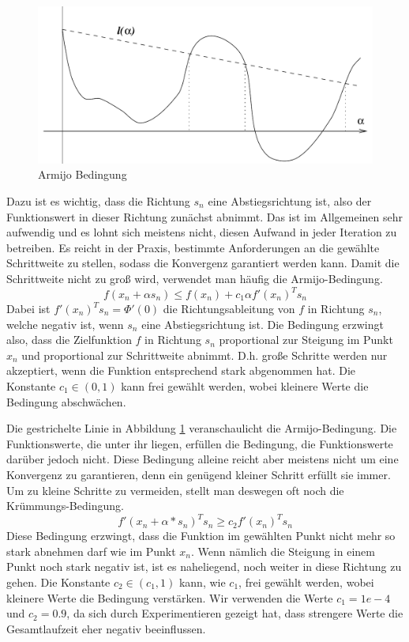 \documentclass[runningheads,a4paper]{llncs}
\begin{document}
\begin{figure}[ht]
 \centering
 \includegraphics[width=\textwidth]{armijo}
 \caption{Armijo Bedingung \cite{nocedal1999numerical}}
 \label{img:armijo}
\end{figure}

Dazu ist es wichtig, dass die Richtung $s_n$ eine Abstiegsrichtung ist, also der Funktionswert in dieser Richtung zunächst abnimmt. Das ist im Allgemeinen sehr aufwendig und es lohnt sich meistens nicht, diesen Aufwand in jeder Iteration zu betreiben. Es reicht in der Praxis, bestimmte Anforderungen an die gewählte Schrittweite zu stellen, sodass die Konvergenz garantiert werden kann. Damit die Schrittweite nicht zu groß wird, verwendet man häufig die Armijo-Bedingung.
\begin{equation}
\label{eq:armijo}
f(x_n+\alpha s_n) \le f(x_n)+c_1\alpha f'(x_n)^T s_n
\end{equation}
Dabei ist $f'(x_n)^T s_n = \Phi'(0)$ die Richtungsableitung von $f$ in Richtung $s_n$, welche negativ ist, wenn $s_n$ eine Abstiegsrichtung ist. Die Bedingung erzwingt also, dass die Zielfunktion $f$ in Richtung $s_n$ proportional zur Steigung im Punkt $x_n$ und proportional zur Schrittweite abnimmt. D.h. große Schritte werden nur akzeptiert, wenn die Funktion entsprechend stark abgenommen hat. Die Konstante $c_1 \in (0,1)$ kann frei gewählt werden, wobei kleinere Werte die Bedingung abschwächen.

Die gestrichelte Linie in Abbildung \ref{img:armijo} veranschaulicht die Armijo-Bedingung. Die Funktionswerte, die unter ihr liegen, erfüllen die Bedingung, die Funktionswerte darüber jedoch nicht. Diese Bedingung alleine reicht aber meistens nicht um eine Konvergenz zu garantieren, denn ein genügend kleiner Schritt erfüllt sie immer. Um zu kleine Schritte zu vermeiden, stellt man deswegen oft noch die Krümmungs-Bedingung.
\begin{equation}
\label{eq:curvature}
f'(x_n+\alpha*s_n)^T s_n \ge c_2 f'(x_n)^T s_n
\end{equation}
Diese Bedingung erzwingt, dass die Funktion im gewählten Punkt nicht mehr so stark abnehmen darf wie im Punkt $x_n$. Wenn nämlich die Steigung in einem Punkt noch stark negativ ist, ist es naheliegend, noch weiter in diese Richtung zu gehen. Die Konstante ${c_2\in (c_1,1)}$ kann, wie $c_1$, frei gewählt werden, wobei kleinere Werte die Bedingung verstärken. Wir verwenden die Werte $c_1 = 1e-4$ und $c_2 = 0.9$, da sich durch Experimentieren gezeigt hat, dass strengere Werte die Gesamtlaufzeit eher negativ beeinflussen.
\end{document}
